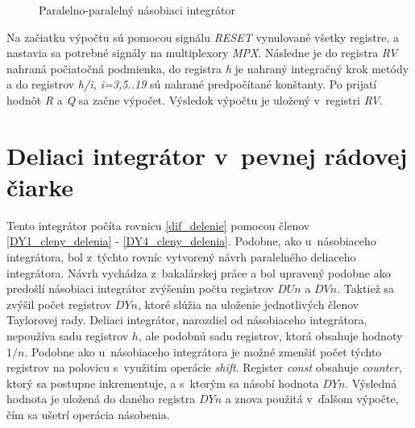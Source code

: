 \bigskip
\begin{figure}[h]
\centering
{}
\caption{Paralelno-paralelný násobiaci integrátor \cite{ZavadaBP}}
\label{ppni}
\end{figure}

Na začiatku výpočtu sú pomocou signálu \textit{RESET} vynulované všetky registre, a nastavia sa potrebné signály na multiplexory \textit{MPX}. Následne je do registra \textit{RV} nahraná počiatočná podmienka, do registra \textit{h} je nahraný integračný krok metódy a do registrov \textit{h/i, i=3,5..19} sú nahrané predpočítané konštanty. Po prijatí hodnôt \textit{R} a \textit{Q} sa začne výpočet. Výsledok výpočtu je uložený v~registri \textit{RV}.


\section{Deliaci integrátor v~pevnej rádovej čiarke}
Tento integrátor počíta rovnicu \eqref{dif_delenie} pomocou členov \eqref{DY1_cleny_delenia} - \eqref{DY4_cleny_delenia}. Podobne, ako u~násobiaceho integrátora, bol z~týchto rovníc vytvorený návrh paralelného deliaceho integrátora. Návrh vychádza z~bakalárskej práce \cite{MatecnyBP} a bol upravený podobne ako predošlí násobiaci integrátor zvýšením počtu registrov $ DUn $ a $ DVn $. Taktiež sa zvýšil počet registrov $ DYn $, ktoré slúžia na uloženie jednotlivých členov Taylorovej rady. Deliaci integrátor, narozdiel od násobiaceho integrátora, nepoužíva sadu registrov $ h $, ale podobnú sadu registrov, ktorá obsahuje hodnoty $ 1/n $. Podobne ako u~násobiaceho integrátora je možné zmenšiť počet týchto registrov na polovicu s~využitím operácie \textit{shift}. Register \textit{const} obsahuje \textit{counter}, ktorý sa postupne inkrementuje, a s~ktorým sa násobí hodnota $ DYn $. Výsledná hodnota je uložená do daného registra $ DYn $ a znova použitá v~ďalšom výpočte, čím sa ušetrí operácia násobenia.

